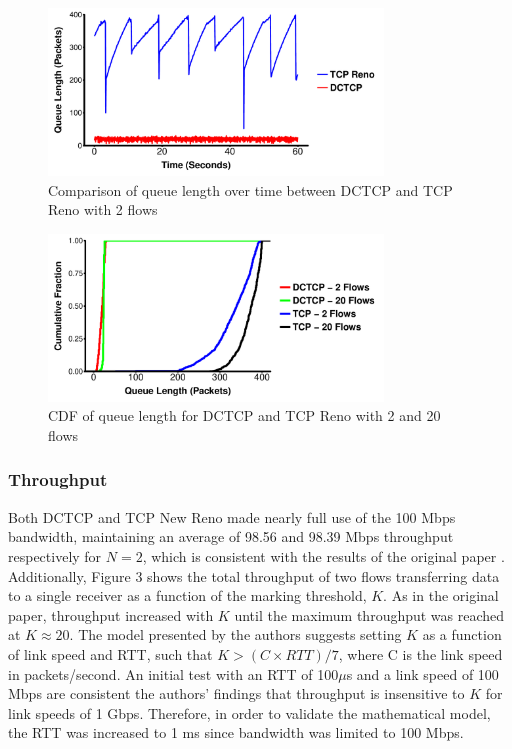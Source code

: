 \begin{figure}
\includegraphics[height=1.75in,width=3.5in]{queue_2_flows}
\caption{Comparison of queue length over time between DCTCP and TCP Reno with 2 flows}
\end{figure}

\begin{figure}
\includegraphics[height=1.75in,width=3.5in]{queue_cdf}
\caption{CDF of queue length for DCTCP and TCP Reno with 2 and 20 flows}
\end{figure}

\subsubsection{Throughput}

Both DCTCP and TCP New Reno made nearly full use of the 100 Mbps bandwidth, maintaining an average of 98.56 and 98.39 Mbps throughput respectively for $N = 2$, which is consistent with the results of the original paper \cite{alizadeh_data_2010}. Additionally, Figure 3 shows the total throughput of two flows transferring data to a single receiver as a function of the marking threshold, $K$. As in the original paper, throughput increased with $K$ until the maximum throughput was reached at $K \approx 20$. The model presented by the authors suggests setting $K$ as a function of link speed and RTT, such that $K > (C \times RTT) / 7$, where C is the link speed in packets/second. An initial test with an RTT of 100$\mu$s and a link speed of 100 Mbps are consistent the authors' findings that throughput is insensitive to $K$ for link speeds of 1 Gbps. Therefore, in order to validate the mathematical model, the RTT was increased to 1 ms since bandwidth was limited to 100 Mbps.

